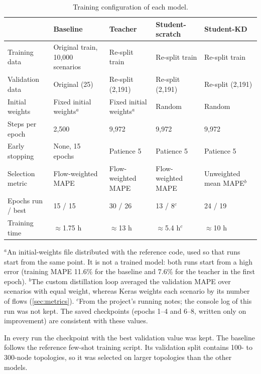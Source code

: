 \begin{table}[ht]
\centering
\small
\caption{Training configuration of each model.}
\label{tab:settings}
\begin{tabularx}{\textwidth}{@{}l Y Y Y Y@{}}
\toprule
 & \textbf{Baseline} & \textbf{Teacher} & \textbf{Student-scratch} & \textbf{Student-KD} \\
\midrule
Training data    & Original train, 10,000 scenarios & Re-split train & Re-split train & Re-split train \\
Validation data  & Original (25) & Re-split (2,191) & Re-split (2,191) & Re-split (2,191) \\
Initial weights  & Fixed initial weights$^{a}$ & Fixed initial weights$^{a}$ & Random & Random \\
Steps per epoch  & 2,500 & 9,972 & 9,972 & 9,972 \\
Early stopping   & None, 15 epochs & Patience 5 & Patience 5 & Patience 5 \\
Selection metric & Flow-weighted MAPE & Flow-weighted MAPE & Flow-weighted MAPE & Unweighted mean MAPE$^{b}$ \\
Epochs run / best & 15 / 15 & 30 / 26 & 13 / 8$^{c}$ & 24 / 19 \\
Training time    & $\approx$1.75 h & $\approx$13 h & $\approx$5.4 h$^{c}$ & $\approx$10 h \\
\bottomrule
\end{tabularx}

\vspace{1mm}
\begin{minipage}{\textwidth}\footnotesize
$^{a}$An initial-weights file distributed with the reference code, used so that runs start from the same point. It is not a trained model: both runs start from a high error (training MAPE 11.6\% for the baseline and 7.6\% for the teacher in the first epoch).
$^{b}$The custom distillation loop averaged the validation MAPE over scenarios with equal weight, whereas Keras weights each scenario by its number of flows (\cref{sec:metrics}).
$^{c}$From the project's running notes; the console log of this run was not kept. The saved checkpoints (epochs 1--4 and 6--8, written only on improvement) are consistent with these values.
\end{minipage}
\end{table}

In every run the checkpoint with the best validation value was kept. The baseline follows the reference few-shot training script. Its validation split contains 100- to 300-node topologies, so it was selected on larger topologies than the other models.

